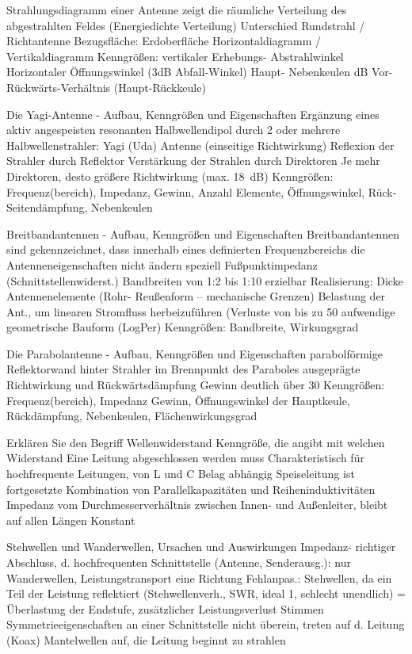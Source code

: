 \documentclass[avery5371,grid,frame,a4paper]{flashcards}
\newcommand{\card}[3]{
  \begin{flashcard}[{\chap} -- #1]{#2}#3\end{flashcard}
}
\begin{document}
\card{67}{Strahlungsdiagramm einer Antenne}{
  zeigt die räumliche Verteilung des abgestrahlten
Feldes (Energiedichte Verteilung)
Unterschied Rundstrahl / Richtantenne
Bezugsfläche: Erdoberfläche
Horizontaldiagramm / Vertikaldiagramm
Kenngrößen: vertikaler Erhebungs- Abstrahlwinkel
Horizontaler Öffnungswinkel (3dB Abfall-Winkel)
Haupt- Nebenkeulen
dB Vor- Rückwärts-Verhältnis (Haupt-Rückkeule)
}
\card{68}{Die Yagi-Antenne - Aufbau, Kenngrößen und Eigenschaften}{
  Ergänzung eines aktiv angespeisten resonanten 
Halbwellendipol durch 2 oder mehrere
Halbwellenstrahler: Yagi (Uda) Antenne (einseitige
Richtwirkung)
Reflexion der Strahler durch Reflektor
Verstärkung der Strahlen durch Direktoren
Je mehr Direktoren, desto größere Richtwirkung
(max. \SI{18}{\dB})
Kenngrößen: Frequenz(bereich), Impedanz, Gewinn,
Anzahl Elemente, Öffnungswinkel, Rück- 
Seitendämpfung, Nebenkeulen
}
\card{69}{Breitbandantennen - Aufbau, Kenngrößen und Eigenschaften}{
  Breitbandantennen sind gekennzeichnet, dass
innerhalb eines definierten Frequenzbereichs die
Antenneneigenschaften nicht ändern
speziell Fußpunktimpedanz (Schnittstellenwiderst.)
Bandbreiten von 1:2 bis 1:10 erzielbar
Realisierung:
Dicke Antennenelemente (Rohr- Reußenform – mechanische
Grenzen)
Belastung der Ant., um linearen Stromfluss
herbeizuführen (Verluste von bis zu 50%
aufwendige geometrische Bauform (LogPer)
Kenngrößen: Bandbreite, Wirkungsgrad
}
\card{70}{Die Parabolantenne - Aufbau, Kenngrößen und Eigenschaften}{
  parabolförmige Reflektorwand hinter Strahler
im Brennpunkt des Paraboles
ausgeprägte Richtwirkung und 
Rückwärtsdämpfung
Gewinn deutlich über 30 %
Kenngrößen: Frequenz(bereich), Impedanz
Gewinn, Öffnungswinkel der Hauptkeule,
Rückdämpfung, Nebenkeulen, 
Flächenwirkungsgrad
}
\card{71}{Erklären Sie den Begriff Wellenwiderstand}{
  Kenngröße, die angibt mit welchen Widerstand 
Eine Leitung abgeschlossen werden muss
Charakteristisch für hochfrequente Leitungen,
von L und C Belag abhängig
Speiseleitung ist fortgesetzte Kombination von 
Parallelkapazitäten und Reiheninduktivitäten
Impedanz vom  Durchmesserverhältnis zwischen
Innen- und Außenleiter, bleibt auf allen Längen
Konstant
}
\card{72}{Stehwellen und Wanderwellen, Ursachen und Auswirkungen}{
  Impedanz- richtiger Abschluss, d. hochfrequenten
Schnittstelle (Antenne, Senderausg.): nur 
Wanderwellen, Leistungstransport eine Richtung
Fehlanpas.: Stehwellen, da ein Teil der Leistung
reflektiert (Stehwellenverh., SWR, ideal 1, 
schlecht unendlich) = Überlastung der Endstufe,
zusätzlicher Leistungsverlust
Stimmen Symmetrieeigenschaften an einer Schnittstelle
nicht überein, treten auf  d. Leitung (Koax) 
Mantelwellen auf, die Leitung beginnt zu strahlen
}
\end{document}
